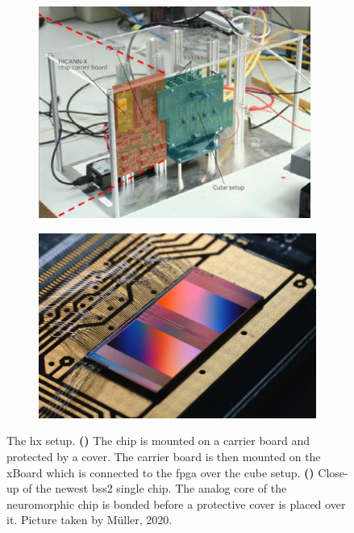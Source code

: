 \begin{figure}[hb!]
	\begin{subfigure}{0.49\textwidth}
		\centering
		\caption{}
		\includegraphics[width=0.98\textwidth]{figures/temporary/cubesetuptmp.png}
		\label{cubesetup}
	\end{subfigure}	
	\begin{subfigure}{0.49\textwidth}
		\centering
		\caption{}
		\includegraphics[width=.98\textwidth]{figures/HXcloseup.JPG}
		\vspace{0.35in}
		\label{hxcloseup}
	\end{subfigure}
	\centering
	\caption[The \acrshort{hx} setup.]{The \acrshort{hx} setup. \textbf{()} The chip is mounted on a carrier board and protected by a cover. The carrier board is then mounted on the xBoard which is  connected to the \gls{fpga} over the cube setup. \textbf{()} Close-up of the newest \gls{bss2} single chip. The analog core of the neuromorphic chip is bonded before a protective cover is placed over it. Picture taken by M{\"u}ller, 2020.} 
	\label{hxsetup}
\end{figure}

